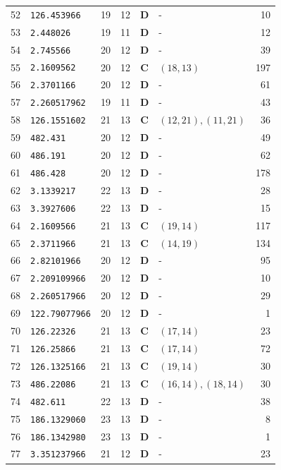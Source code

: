 \documentclass[11pt,a4paper]{article}
\begin{document}
\begin{small}
\begin{longtable}{r l c c c l r}
52 & \texttt{126.453966} & 19 & 12 & \textbf{D} & - & 10 \\
53 & \texttt{2.448026} & 19 & 11 & \textbf{D} & - & 12 \\
54 & \texttt{2.745566} & 20 & 12 & \textbf{D} & - & 39 \\
55 & \texttt{2.1609562} & 20 & 12 & \textbf{C} & $(18,13)$ & 197 \\
56 & \texttt{2.3701166} & 20 & 12 & \textbf{D} & - & 61 \\
57 & \texttt{2.260517962} & 19 & 11 & \textbf{D} & - & 43 \\
58 & \texttt{126.1551602} & 21 & 13 & \textbf{C} & $(12,21), (11,21)$ & 36 \\
59 & \texttt{482.431} & 20 & 12 & \textbf{D} & - & 49 \\
60 & \texttt{486.191} & 20 & 12 & \textbf{D} & - & 62 \\
61 & \texttt{486.428} & 20 & 12 & \textbf{D} & - & 178 \\
62 & \texttt{3.1339217} & 22 & 13 & \textbf{D} & - & 28 \\
63 & \texttt{3.3927606} & 22 & 13 & \textbf{D} & - & 15 \\
64 & \texttt{2.1609566} & 21 & 13 & \textbf{C} & $(19,14)$ & 117 \\
65 & \texttt{2.3711966} & 21 & 13 & \textbf{C} & $(14,19)$ & 134 \\
66 & \texttt{2.82101966} & 20 & 12 & \textbf{D} & - & 95 \\
67 & \texttt{2.209109966} & 20 & 12 & \textbf{D} & - & 10 \\
68 & \texttt{2.260517966} & 20 & 12 & \textbf{D} & - & 29 \\
69 & \texttt{122.79077966} & 20 & 12 & \textbf{D} & - & 1 \\
70 & \texttt{126.22326} & 21 & 13 & \textbf{C} & $(17,14)$ & 23 \\
71 & \texttt{126.25866} & 21 & 13 & \textbf{C} & $(17,14)$ & 72 \\
72 & \texttt{126.1325166} & 21 & 13 & \textbf{C} & $(19,14)$ & 30 \\
73 & \texttt{486.22086} & 21 & 13 & \textbf{C} & $(16,14), (18,14)$ & 30 \\
74 & \texttt{482.611} & 22 & 13 & \textbf{D} & - & 38 \\
75 & \texttt{186.1329060} & 23 & 13 & \textbf{D} & - & 8 \\
76 & \texttt{186.1342980} & 23 & 13 & \textbf{D} & - & 1 \\
77 & \texttt{3.351237966} & 21 & 12 & \textbf{D} & - & 23 \\

\end{longtable}
\end{small}
\end{document}
